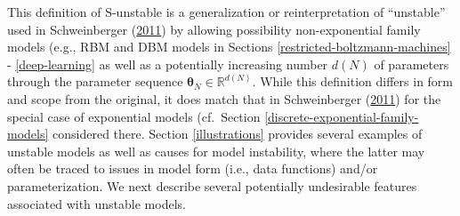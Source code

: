 \documentclass[]{article}
\theoremstyle{definition}
\begin{document}
This definition of S-unstable is a generalization or reinterpretation of
``unstable'' used in Schweinberger
(\protect\hyperlink{ref-schweinberger2011instability}{2011}) by allowing
possibility non-exponential family models (e.g., RBM and DBM models in
Sections \ref{restricted-boltzmann-machines} - \ref{deep-learning} as
well as a potentially increasing number \(d(N)\) of parameters through
the parameter sequence \(\boldsymbol \theta_N\in \mathbb{R}^{d(N)}\).
While this definition differs in form and scope from the original, it
does match that in Schweinberger
(\protect\hyperlink{ref-schweinberger2011instability}{2011}) for the
special case of exponential models (cf.~Section
\ref{discrete-exponential-family-models} considered there. Section
\ref{illustrations} provides several examples of unstable models as well
as causes for model instability, where the latter may often be traced to
issues in model form (i.e., data functions) and/or parameterization. We
next describe several potentially undesirable features associated with
unstable models.
\end{document}
